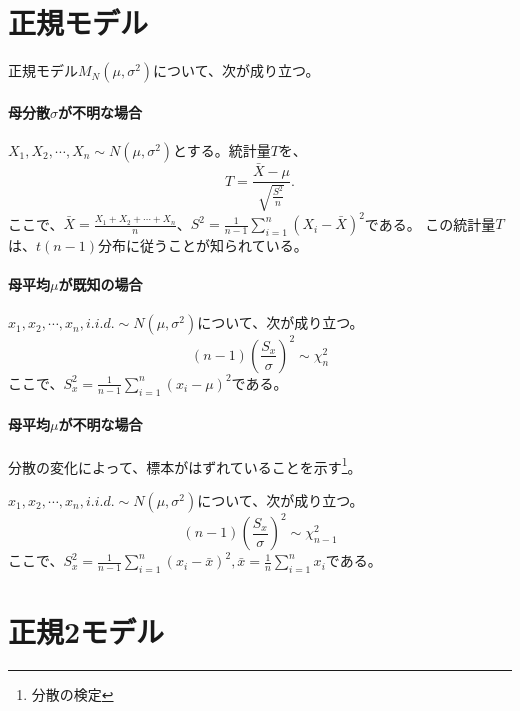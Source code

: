 \section{正規モデル}
正規モデル$M_N(\mu,\sigma^2)$について、次が成り立つ。
\paragraph{母分散$\sigma$が不明な場合}
$X_1,X_2,\cdots,X_n \sim N(\mu,\sigma^2)$とする。統計量$T$を、
\begin{equation*}
    T = \frac{\bar{X}-\mu}{\sqrt{\frac{S^2}{n}}}.
\end{equation*}
ここで、$\bar{X}=\frac{X_1+X_2+\cdots+X_n}{n}$、$S^2=\frac{1}{n-1}\sum_{i=1}^{n}(X_i-\bar{X})^2$である。
この統計量$T$は、$t(n-1)$分布に従うことが知られている。


\paragraph{母平均$\mu$が既知の場合}
\begin{theo}\label{normal_sigma_chi2}
    $x_1,x_2,\cdots,x_n,i.i.d. \sim N(\mu,\sigma^2)$について、次が成り立つ。
    \begin{equation*}
     (n-1)\left(\frac{S_x}{\sigma} \right)^2 \sim \chi^2_{n}
    \end{equation*}
    ここで、$S^2_x=\frac{1}{n-1}\sum_{i=1}^n(x_i-\mu)^2$である。
\end{theo}

\paragraph{母平均$\mu$が不明な場合}
分散の変化によって、標本がはずれていることを示す\footnote{分散の検定}。
\begin{theo}\label{normal_sigma_chi2}
    $x_1,x_2,\cdots,x_n,i.i.d. \sim N(\mu,\sigma^2)$について、次が成り立つ。
    \begin{equation*}
        (n-1)\left(\frac{S_x}{\sigma} \right)^2 \sim \chi^2_{n-1}
    \end{equation*}
    ここで、$S^2_x=\frac{1}{n-1}\sum_{i=1}^n(x_i-\bar{x})^2,\bar{x}=\frac{1}{n}\sum_{i=1}^n x_i$である。
\end{theo}

\section{正規2モデル}
